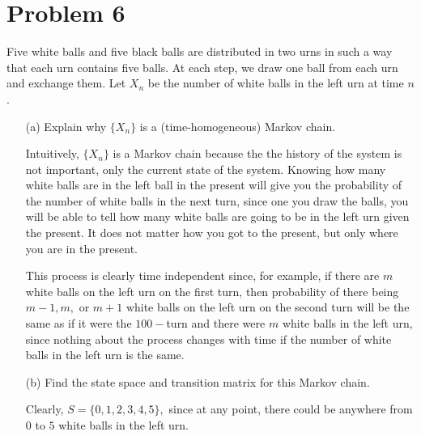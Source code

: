 \documentclass[11pt]{article}
\begin{document}
\section*{Problem 6}
\begin{problem}
    Five white balls and five black balls are distributed in two urns in such a way that each urn contains five balls. At each step, we draw one ball from each urn and exchange them. Let \( X_n \) be the number of white balls in the left urn at time \( n \).

\begin{enumerate}
    \item[(a)] Explain why \( \{X_n\} \) is a (time-homogeneous) Markov chain.
    \begin{solution}
    Intuitively, $\{X_n\}$ is a Markov chain because the the history of the system is not important, only the current state of the system. Knowing how many white balls are in the left ball in the present will give you the probability of the number of white balls in the next turn, since one you draw the balls, you will be able to tell how many white balls are going to be in the left urn given the present. It does not matter how you got to the present, but only where you are in the present. 

    This process is clearly time independent since, for example, if there are $m$ white balls on the left urn on the first turn, then probability of there being $m-1, m,$ or $m+1$ white balls on the left urn on the second turn will be the same as if it were the $100-$turn and there were $m$ white balls in the left urn, since nothing about the process changes with time if the number of white balls in the left urn is the same.
    \end{solution}
    \item[(b)] Find the state space and transition matrix for this Markov chain.
    \begin{solution}
        Clearly, $S = \{0,1,2,3,4,5\},$ since at any point, there could be anywhere from $0$ to $5$ white balls in the left urn. 


\end{solution}
\end{enumerate}
\end{problem}
\end{document}
